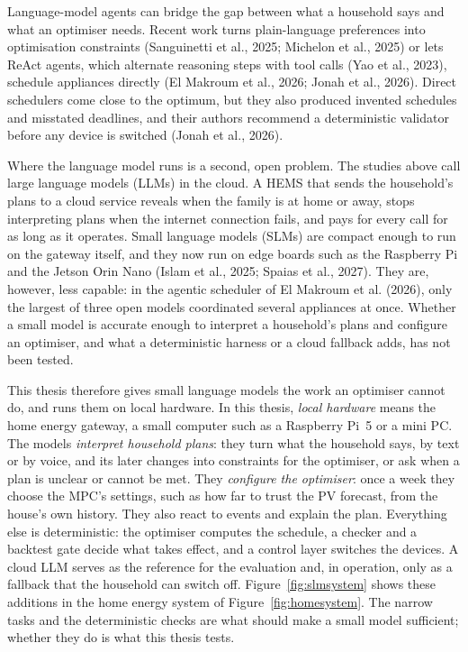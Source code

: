 \documentclass[12pt,a4paper]{report}
\begin{document}
Language-model agents can bridge the gap between what a household says
and what an optimiser needs. Recent work turns plain-language
preferences into optimisation constraints
(Sanguinetti et al., 2025; Michelon et al., 2025) or lets ReAct agents, which
alternate reasoning steps with tool calls (Yao et al., 2023), schedule
appliances directly (El Makroum et al., 2026; Jonah et al., 2026). Direct
schedulers come close to the optimum, but they also produced invented
schedules and misstated deadlines, and their authors recommend a
deterministic validator before any device is switched
(Jonah et al., 2026).

Where the language model runs is a second, open problem. The studies
above call large language models (LLMs) in the cloud. A HEMS that sends
the household's plans to a cloud service reveals when the family is at
home or away, stops interpreting plans when the internet connection
fails, and pays for every call for as long as it operates.
Small language models (SLMs) are compact enough to run on the gateway
itself, and they now run on edge boards such as the
Raspberry Pi and the Jetson Orin Nano (Islam et al., 2025; Spaias et al., 2027).
They are, however, less capable: in the agentic scheduler of
El Makroum et al. (2026), only the largest of three open models
coordinated several appliances at once. Whether a small model is
accurate enough to interpret a household's plans and configure an
optimiser, and what a deterministic harness or a cloud fallback adds,
has not been tested.

This thesis therefore gives small language models the work an optimiser
cannot do, and runs them on local hardware. In this thesis,
\textit{local hardware} means the home energy gateway, a small computer
such as a Raspberry Pi~5 or a mini PC. The models \textit{interpret
household plans}: they turn what the household says, by text or by
voice, and its later changes into constraints for the optimiser, or ask
when a plan is unclear or cannot be met. They \textit{configure the
optimiser}: once a week they choose the MPC's settings, such as how far
to trust the PV forecast, from the house's own history. They also react
to events and explain the plan. Everything else is deterministic: the
optimiser computes the schedule, a checker and a backtest gate decide
what takes effect, and a control layer switches the devices. A cloud
LLM serves as the reference for the evaluation and, in operation, only
as a fallback that the household can switch off.
Figure~\ref{fig:slmsystem} shows these additions in the home energy
system of Figure~\ref{fig:homesystem}. The narrow tasks and
the deterministic checks are what should make a small model sufficient;
whether they do is what this thesis tests.
\end{document}
